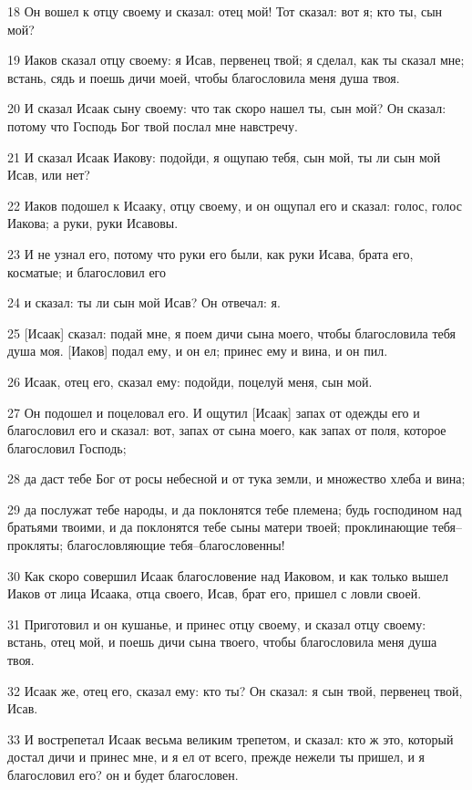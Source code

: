 \par 18 Он вошел к отцу своему и сказал: отец мой! Тот сказал: вот я; кто ты, сын мой?
\par 19 Иаков сказал отцу своему: я Исав, первенец твой; я сделал, как ты сказал мне; встань, сядь и поешь дичи моей, чтобы благословила меня душа твоя.
\par 20 И сказал Исаак сыну своему: что так скоро нашел ты, сын мой? Он сказал: потому что Господь Бог твой послал мне навстречу.
\par 21 И сказал Исаак Иакову: подойди, я ощупаю тебя, сын мой, ты ли сын мой Исав, или нет?
\par 22 Иаков подошел к Исааку, отцу своему, и он ощупал его и сказал: голос, голос Иакова; а руки, руки Исавовы.
\par 23 И не узнал его, потому что руки его были, как руки Исава, брата его, косматые; и благословил его
\par 24 и сказал: ты ли сын мой Исав? Он отвечал: я.
\par 25 [Исаак] сказал: подай мне, я поем дичи сына моего, чтобы благословила тебя душа моя. [Иаков] подал ему, и он ел; принес ему и вина, и он пил.
\par 26 Исаак, отец его, сказал ему: подойди, поцелуй меня, сын мой.
\par 27 Он подошел и поцеловал его. И ощутил [Исаак] запах от одежды его и благословил его и сказал: вот, запах от сына моего, как запах от поля, которое благословил Господь;
\par 28 да даст тебе Бог от росы небесной и от тука земли, и множество хлеба и вина;
\par 29 да послужат тебе народы, и да поклонятся тебе племена; будь господином над братьями твоими, и да поклонятся тебе сыны матери твоей; проклинающие тебя--прокляты; благословляющие тебя--благословенны!
\par 30 Как скоро совершил Исаак благословение над Иаковом, и как только вышел Иаков от лица Исаака, отца своего, Исав, брат его, пришел с ловли своей.
\par 31 Приготовил и он кушанье, и принес отцу своему, и сказал отцу своему: встань, отец мой, и поешь дичи сына твоего, чтобы благословила меня душа твоя.
\par 32 Исаак же, отец его, сказал ему: кто ты? Он сказал: я сын твой, первенец твой, Исав.
\par 33 И вострепетал Исаак весьма великим трепетом, и сказал: кто ж это, который достал дичи и принес мне, и я ел от всего, прежде нежели ты пришел, и я благословил его? он и будет благословен.
